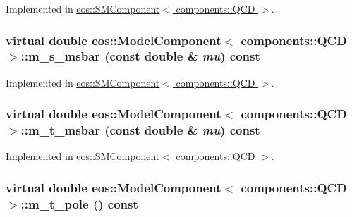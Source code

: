 Implemented in \hyperlink{classeos_1_1SMComponent_3_01components_1_1QCD_01_4_a013ddfb77a30fe05fd3593c1528331b0}{eos::SMComponent$<$ components::QCD $>$}.\hypertarget{classeos_1_1ModelComponent_3_01components_1_1QCD_01_4_ac93d5c86dbb1e6118ab972e8c0f6bc12}{
\subsubsection[{m\_\-s\_\-msbar}]{\setlength{\rightskip}{0pt plus 5cm}virtual double eos::ModelComponent$<$ components::QCD $>$::m\_\-s\_\-msbar (const double \& {\em mu}) const}}
\label{classeos_1_1ModelComponent_3_01components_1_1QCD_01_4_ac93d5c86dbb1e6118ab972e8c0f6bc12}


Implemented in \hyperlink{classeos_1_1SMComponent_3_01components_1_1QCD_01_4_a0d31a7565a92e0dca81e153932690945}{eos::SMComponent$<$ components::QCD $>$}.\hypertarget{classeos_1_1ModelComponent_3_01components_1_1QCD_01_4_af57a3d70de7579dcf92aeacff6439a40}{
\subsubsection[{m\_\-t\_\-msbar}]{\setlength{\rightskip}{0pt plus 5cm}virtual double eos::ModelComponent$<$ components::QCD $>$::m\_\-t\_\-msbar (const double \& {\em mu}) const}}
\label{classeos_1_1ModelComponent_3_01components_1_1QCD_01_4_af57a3d70de7579dcf92aeacff6439a40}


Implemented in \hyperlink{classeos_1_1SMComponent_3_01components_1_1QCD_01_4_a6bda92aac898c86185a8f3fca6f575cf}{eos::SMComponent$<$ components::QCD $>$}.\hypertarget{classeos_1_1ModelComponent_3_01components_1_1QCD_01_4_a0035735c19d0b3fced44b986b09410b7}{
\subsubsection[{m\_\-t\_\-pole}]{\setlength{\rightskip}{0pt plus 5cm}virtual double eos::ModelComponent$<$ components::QCD $>$::m\_\-t\_\-pole () const}}
\label{classeos_1_1ModelComponent_3_01components_1_1QCD_01_4_a0035735c19d0b3fced44b986b09410b7}



